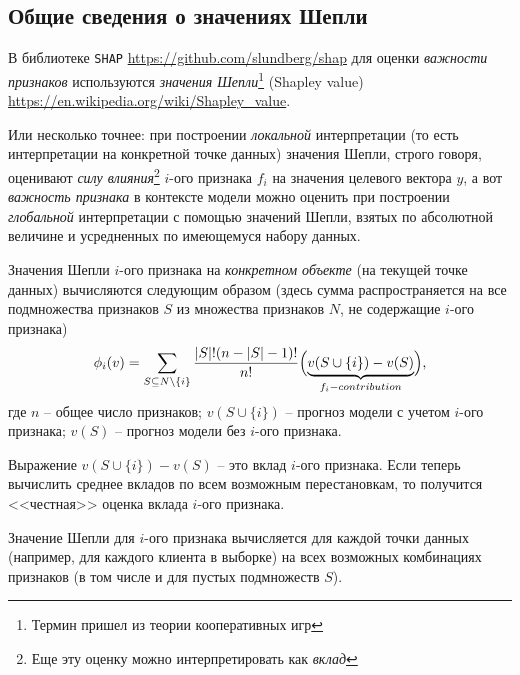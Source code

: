 \documentclass[%
	11pt,
	a4paper,
	utf8,
		]{article}
\begin{document}
\subsection{Общие сведения о значениях Шепли}

В библиотеке \texttt{SHAP} \url{https://github.com/slundberg/shap} для оценки \emph{важности признаков} используются \emph{значения Шепли}\footnote{Термин пришел из теории кооперативных игр} (Shapley value) \url{https://en.wikipedia.org/wiki/Shapley_value}.

Или несколько точнее: при построении \emph{локальной} интерпретации (то есть интерпретации на конкретной точке данных) значения Шепли, строго говоря, оценивают \emph{силу влияния}\footnote{Еще эту оценку можно интерпретировать как \emph{вклад}} $ i $-ого признака $ f_i $ на значения целевого вектора $ y $, а вот \emph{важность признака} в контексте модели можно оценить при построении \emph{глобальной} интерпретации с помощью значений Шепли, взятых по абсолютной величине и усредненных по имеющемуся набору данных. 


Значения Шепли $i$-ого признака на \emph{конкретном объекте} (на текущей точке данных) вычисляются следующим образом (здесь сумма распространяется на все подмножества признаков $ S $ из множества признаков $ N $, не содержащие $ i $-ого признака)
\begin{align*}
\phi_i(v) = \sum_{S \subseteq N\setminus\{i\}} \dfrac{|S|!(n - |S| - 1)!}{n!}\Bigl( \underset{f_i-contribution }{\underbrace{ v(S \cup \{i\}) - v(S)}} \Bigr),
\end{align*}
где $ n $ -- общее число признаков; $ v(S \cup \{i\}) $ -- прогноз модели с учетом $ i $-ого признака; $ v(S) $ -- прогноз модели без $ i $-ого признака.

Выражение $ v(S \cup \{i\}) - v(S) $ -- это вклад $ i $-ого признака. Если теперь вычислить среднее вкладов по всем возможным перестановкам, то получится <<честная>> оценка вклада $ i $-ого признака.

Значение Шепли для $ i $-ого признака вычисляется для каждой точки данных (например, для каждого клиента в выборке) на всех возможных комбинациях признаков (в том числе и для пустых подмножеств $ S $).

\end{document}
